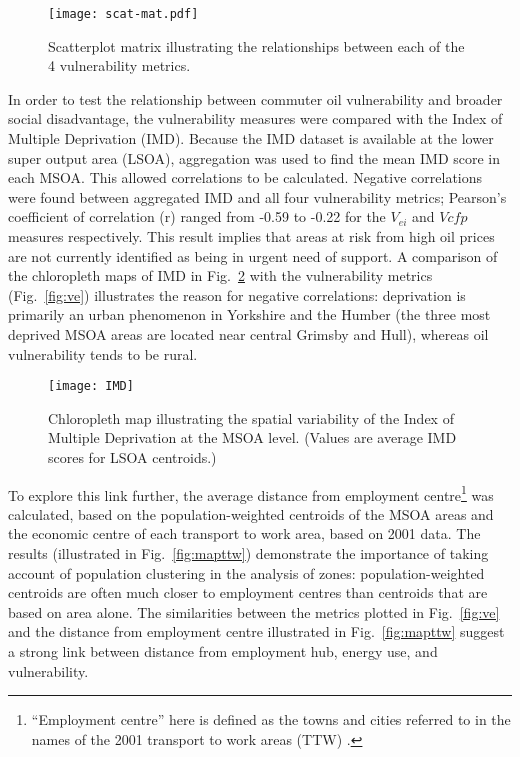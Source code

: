 \begin{figure}[t]
 \centering
\texttt{[image: scat-mat.pdf]}
 \caption[Scatterplot matrix of vulnerability metrics]
 {Scatterplot matrix illustrating the relationships between each of
the 4 vulnerability metrics.}
 \label{fig:scat-mat}
\end{figure}

In order to test the relationship between commuter oil vulnerability and
broader social disadvantage, the vulnerability measures were compared
with the Index of Multiple Deprivation (IMD). Because the IMD dataset is available
at the lower super output area (LSOA), aggregation was used to find the mean
IMD score in each MSOA. This allowed correlations to be calculated.
Negative correlations were found between aggregated IMD and
all four vulnerability metrics;
Pearson's coefficient of correlation
(r) ranged from -0.59 to -0.22
for the $V_{ei}$ and $V{cfp}$ measures respectively.
This result implies that
areas at risk from high oil prices are not currently identified as
being in urgent need of support. A comparison of the chloropleth maps
of IMD in Fig.~\ref{fig:IMD} with the vulnerability metrics
(Fig.~\ref{fig:ve}) illustrates the reason
for negative correlations: deprivation is primarily an urban phenomenon in
Yorkshire and the Humber (the three most deprived MSOA areas
are located near central Grimsby and Hull),
whereas oil vulnerability tends to be rural.

\begin{figure}[t]
 \centering
\texttt{[image: IMD]}
 \caption[Chloropleth map of deprivation in Yorkshire and the Humber]
 {Chloropleth map illustrating the spatial variability of
the Index of Multiple Deprivation at the MSOA level. (Values are
average IMD scores for LSOA centroids.)}
 \label{fig:IMD}
\end{figure}

To explore this link further, the average distance from employment
centre\footnote{``Employment centre'' here is defined as the towns and cities
referred to in the names of the 2001 transport to work areas (TTW)
\citep{ONS2011-ttw}.} was calculated, based on the population-weighted centroids
of the MSOA areas and the economic centre of each transport to work area, based
on 2001 data. The results (illustrated in Fig.~\ref{fig:mapttw}) demonstrate
the importance of taking account of population clustering in the analysis of
zones: population-weighted centroids are often much closer to employment
centres than centroids that are based on area alone.
The similarities between
the metrics plotted in Fig.~\ref{fig:ve}
and the distance from employment centre illustrated in Fig.~\ref{fig:mapttw}
suggest a strong link between distance from employment hub, energy use, and
vulnerability.

